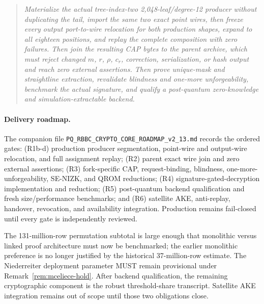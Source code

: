 \documentclass[11pt]{article}
\begin{document}
\begin{quote}
\emph{Materialize the actual tree-index-two
2,048-leaf/degree-12 producer without duplicating the tail, import the same
two exact point wires, then freeze every output port-to-wire relocation for
both production shapes,
expand to all eighteen positions, and replay the complete composition with
zero failures.  Then join the resulting
CAP bytes to the parent archive, which must reject changed $m$, $r$, $\rho$,
$c_r$, correction, serialization, or hash output and reach zero external
assertions.  Then prove
unique-mask and straightline extraction, revalidate blindness and one-more
unforgeability, benchmark the actual signature, and qualify a post-quantum
zero-knowledge and simulation-extractable backend.}
\end{quote}

\paragraph{Delivery roadmap.}
The companion file
\texttt{PQ\_RBBC\_CRYPTO\_CORE\_ROADMAP\_v2\_13.md} records the ordered gates:
(R1b-d) production producer segmentation, point-wire and output-wire
relocation, and full assignment replay;
(R2) parent exact wire join and zero external assertions; (R3) fork-specific CAP, request-binding, blindness,
one-more-unforgeability, SE-NIZK, and QROM reductions; (R4)
signature-gated-decryption implementation and reduction; (R5) post-quantum
backend qualification and fresh size/performance benchmarks; and (R6)
satellite AKE, anti-replay, handover, revocation, and availability integration.
Production remains fail-closed until every gate is independently reviewed.

The 131-million-row permutation subtotal is large enough that monolithic versus
linked proof architecture must now be benchmarked; the earlier monolithic
preference is no longer justified by the historical 37-million-row estimate.
The Niederreiter deployment parameter MUST remain provisional under
Remark~\ref{rem:mceliece-hold}.  After backend qualification, the remaining
cryptographic component is the robust threshold-share transcript.  Satellite
AKE integration remains out of scope until those two obligations close.
\end{document}
